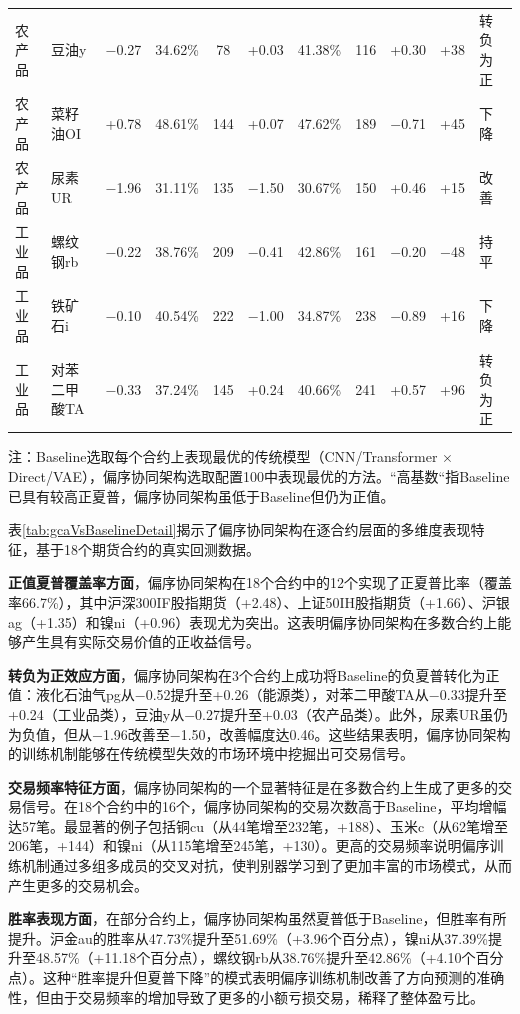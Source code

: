 \begin{table}
\begin{tabular}{llccccccccl}
农产品 & 豆油y & $-$0.27 & 34.62\% & 78 & +0.03 & 41.38\% & 116 & +0.30 & +38 & 转负为正 \\
农产品 & 菜籽油OI & +0.78 & 48.61\% & 144 & +0.07 & 47.62\% & 189 & $-$0.71 & +45 & 下降 \\
农产品 & 尿素UR & $-$1.96 & 31.11\% & 135 & $-$1.50 & 30.67\% & 150 & +0.46 & +15 & 改善 \\
工业品 & 螺纹钢rb & $-$0.22 & 38.76\% & 209 & $-$0.41 & 42.86\% & 161 & $-$0.20 & $-$48 & 持平 \\
工业品 & 铁矿石i & $-$0.10 & 40.54\% & 222 & $-$1.00 & 34.87\% & 238 & $-$0.89 & +16 & 下降 \\
工业品 & 对苯二甲酸TA & $-$0.33 & 37.24\% & 145 & +0.24 & 40.66\% & 241 & +0.57 & +96 & 转负为正 \\
\bottomrule
\end{tabular}
\vspace{0.2cm}

\raggedright \scriptsize 注：Baseline选取每个合约上表现最优的传统模型（CNN/Transformer $\times$ Direct/VAE），偏序协同架构选取配置100中表现最优的方法。“高基数“指Baseline已具有较高正夏普，偏序协同架构虽低于Baseline但仍为正值。
\end{table}

表\ref{tab:gcaVsBaselineDetail}揭示了偏序协同架构在逐合约层面的多维度表现特征，基于18个期货合约的真实回测数据。

\textbf{正值夏普覆盖率方面}，偏序协同架构在18个合约中的12个实现了正夏普比率（覆盖率66.7\%），其中沪深300IF股指期货（+2.48）、上证50IH股指期货（+1.66）、沪银ag（+1.35）和镍ni（+0.96）表现尤为突出。这表明偏序协同架构在多数合约上能够产生具有实际交易价值的正收益信号。

\textbf{转负为正效应方面}，偏序协同架构在3个合约上成功将Baseline的负夏普转化为正值：液化石油气pg从$-$0.52提升至+0.26（能源类），对苯二甲酸TA从$-$0.33提升至+0.24（工业品类），豆油y从$-$0.27提升至+0.03（农产品类）。此外，尿素UR虽仍为负值，但从$-$1.96改善至$-$1.50，改善幅度达0.46。这些结果表明，偏序协同架构的训练机制能够在传统模型失效的市场环境中挖掘出可交易信号。

\textbf{交易频率特征方面}，偏序协同架构的一个显著特征是在多数合约上生成了更多的交易信号。在18个合约中的16个，偏序协同架构的交易次数高于Baseline，平均增幅达57笔。最显著的例子包括铜cu（从44笔增至232笔，+188）、玉米c（从62笔增至206笔，+144）和镍ni（从115笔增至245笔，+130）。更高的交易频率说明偏序训练机制通过多组多成员的交叉对抗，使判别器学习到了更加丰富的市场模式，从而产生更多的交易机会。

\textbf{胜率表现方面}，在部分合约上，偏序协同架构虽然夏普低于Baseline，但胜率有所提升。沪金au的胜率从47.73\%提升至51.69\%（+3.96个百分点），镍ni从37.39\%提升至48.57\%（+11.18个百分点），螺纹钢rb从38.76\%提升至42.86\%（+4.10个百分点）。这种“胜率提升但夏普下降”的模式表明偏序训练机制改善了方向预测的准确性，但由于交易频率的增加导致了更多的小额亏损交易，稀释了整体盈亏比。

